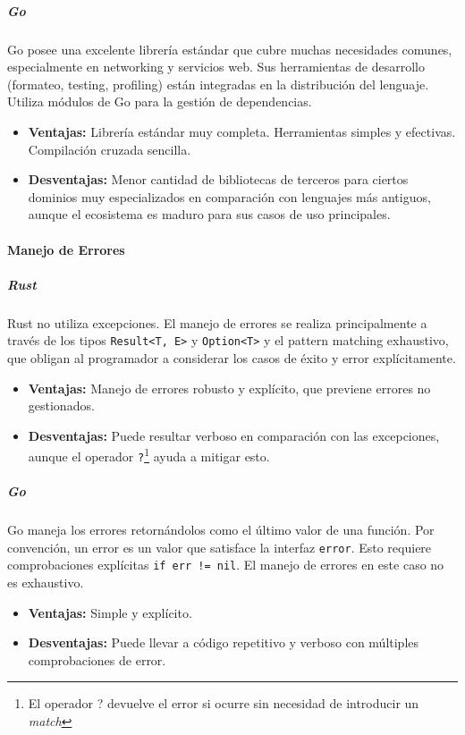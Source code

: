 \subparagraph{Go}
Go posee una excelente librería estándar que cubre muchas necesidades comunes, especialmente en networking y servicios web. Sus herramientas de desarrollo (formateo, testing, profiling) están integradas en la distribución del lenguaje. Utiliza módulos de Go para la gestión de dependencias.
\begin{itemize}
    \item \textbf{Ventajas:} Librería estándar muy completa. Herramientas simples y efectivas. Compilación cruzada sencilla.
    \item \textbf{Desventajas:} Menor cantidad de bibliotecas de terceros para ciertos dominios muy especializados en comparación con lenguajes más antiguos, aunque el ecosistema es maduro para sus casos de uso principales.
\end{itemize}

\paragraph{Manejo de Errores}
\subparagraph{Rust}
Rust no utiliza excepciones. El manejo de errores se realiza principalmente a través de los tipos \texttt{Result<T, E>} y \texttt{Option<T>} y el pattern matching exhaustivo, que obligan al programador a considerar los casos de éxito y error explícitamente.
\begin{itemize}
    \item \textbf{Ventajas:} Manejo de errores robusto y explícito, que previene errores no gestionados.
    \item \textbf{Desventajas:} Puede resultar verboso en comparación con las excepciones, aunque el operador \texttt{?}\footnote{El operador ? devuelve el error si ocurre sin necesidad de introducir un \textit{match}} ayuda a mitigar esto.
\end{itemize}

\subparagraph{Go}
Go maneja los errores retornándolos como el último valor de una función. Por convención, un error es un valor que satisface la interfaz \texttt{error}. Esto requiere comprobaciones explícitas \texttt{if err != nil}.
El manejo de errores en este caso no es exhaustivo.
\begin{itemize}
    \item \textbf{Ventajas:} Simple y explícito.
    \item \textbf{Desventajas:} Puede llevar a código repetitivo y verboso con múltiples comprobaciones de error.
\end{itemize}

